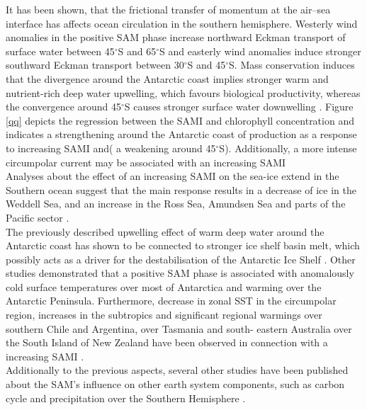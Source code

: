 It has been shown, that the frictional transfer of momentum at the air–sea interface has affects ocean circulation in the southern hemisphere. Westerly wind anomalies in the positive SAM phase increase northward Eckman transport of surface water between 45$^\circ$S and 65$^\circ$S and easterly wind anomalies induce stronger southward Eckman transport between 30$^\circ$S and 45$^\circ$S. Mass conservation induces that the divergence around the Antarctic coast implies stronger warm and nutrient-rich deep water upwelling, which favours biological productivity, whereas the convergence around 45$^\circ$S causes  stronger surface water downwelling \cite{Lovenduski2005}. Figure \ref{qq} depicts the regression between the SAMI and chlorophyll concentration and indicates a strengthening around the Antarctic coast of production as a response to increasing SAMI and( a weakening around 45$^\circ$S).  Additionally, a more intense circumpolar current may be associated with an increasing SAMI \cite{Hall2002}\\

Analyses about the effect of an increasing SAMI on the sea-ice extend in the Southern ocean suggest that the main response results in a decrease of ice in the Weddell Sea, and an increase in the Ross Sea, Amundsen Sea and parts of the Pacific sector \cite{Lefebvre2004}.\\

The previously described upwelling effect of  warm deep water around the Antarctic coast has shown to be connected to stronger ice shelf basin melt, which possibly acts as a driver for the destabilisation of the Antarctic Ice Shelf \cite{Greene2017}.
Other studies demonstrated that a positive SAM phase is associated with anomalously cold surface temperatures over most of Antarctica and warming over the Antarctic Peninsula. Furthermore, decrease in zonal SST in the circumpolar region, increases in the subtropics  \cite{Hall2002} and significant regional warmings over southern Chile and Argentina, over Tasmania and south- eastern Australia over the South Island of New Zealand have been observed in connection with a increasing SAMI \cite{Gillett2006}.\\

Additionally to the previous aspects, several other studies have been published about the SAM's influence on other earth system components, such as carbon cycle \cite{Butler2007} and precipitation over the Southern Hemisphere \cite{Silvestri2003}.





